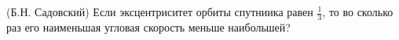 (Б.Н. Садовский)
Если эксцентриситет орбиты спутниика равен $\frac{1}{3}$, то во сколько
раз его наименьшая угловая скорость меньше наибольшей?
